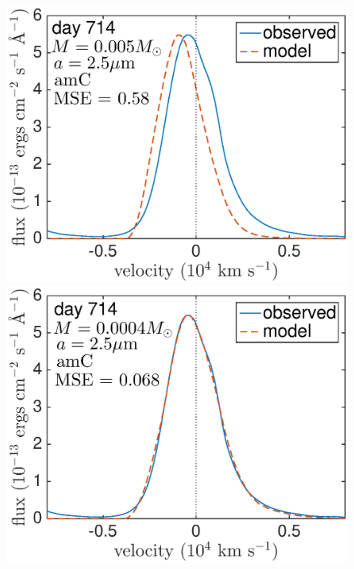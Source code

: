 \begin{figure}
\includegraphics[trim =0 30 0 0,clip=true,scale=0.34]{chapters/chapter5/images/silicates_take2/AmC_Dwek_Ha.eps}
\hspace{3mm}
\includegraphics[trim =0 30 0 -10,clip=true,scale=0.34]{chapters/chapter5/images/silicates_take2/AmC_bestfit_Ha.eps}


\end{figure}
